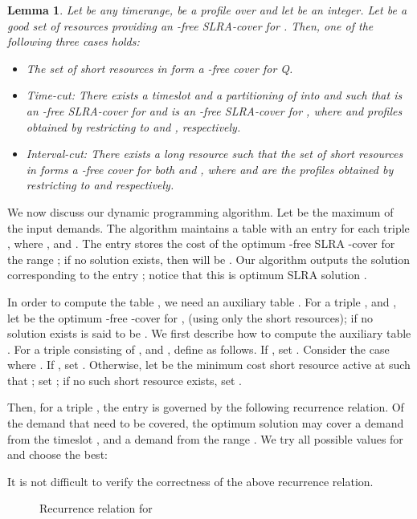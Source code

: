 \documentclass[11pt]{article}
\newtheorem{lemma}[theorem]{Lemma}
\begin{document}
\begin{lemma}
\label{lem:decomp}
Let  be any timerange,  be a profile over  and let  be an integer.
Let  be a good set of resources providing an -free SLRA-cover for .
Then, one of the following three cases holds:
\begin{itemize}
\item
The set of short resources in  form a -free cover for Q.
\item 
{\it Time-cut: } There exists a timeslot  and a partitioning of  into  and 
such that  is an -free SLRA-cover for  and  is an -free SLRA-cover for ,
where  and  profiles obtained by restricting  to  and , respectively.
\item
{\it Interval-cut:}
There exists a long resource 
such that the set of short resources in  forms a -free cover for both  and , where
 and   are the profiles obtained by restricting  to  and   
respectively.
\end{itemize}
\end{lemma}

We now discuss our dynamic programming algorithm.
Let  be the maximum of  the input demands. 
The algorithm maintains a table  with an entry for each triple ,
where ,  and .
The entry  stores the cost of the optimum -free SLRA -cover for the range ;
if no solution exists, then  will be .
Our algorithm outputs the solution corresponding to the entry  ; notice that 
this is optimum SLRA solution .

In order to compute the table , we need an auxiliary table .
For a triple ,  and , let  be the optimum -free -cover for ,
(using only the short resources); if no solution exists  is said to be .
We first describe how to compute the auxiliary table . 
For a triple consisting of ,  and
, define  as follows.
If , set .
Consider the case where .
If , set .
Otherwise, let  be the minimum cost short resource active at  such that ;
set ; if no such short resource exists, set .

Then, for a triple , the entry  is governed
by the following recurrence relation. Of the demand  that need to be covered,
the optimum solution may cover a demand   from the timeslot , and a demand  from the  range .
We try all possible values for  and choose the best:

It is not difficult to verify the correctness of the above recurrence relation.


\begin{figure*}
\caption{Recurrence relation for }
\label{fig:formula}
\end{figure*}
\end{document}
